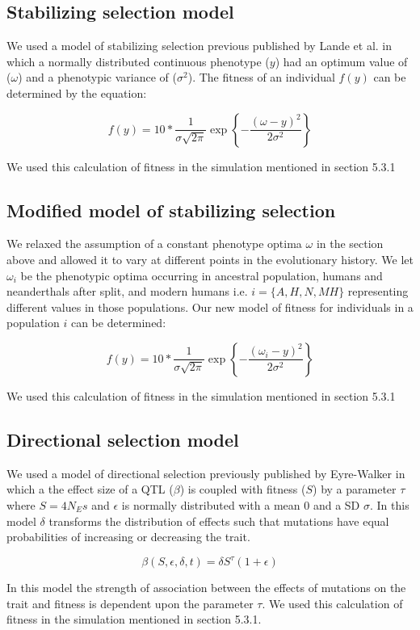 \subsection{Stabilizing selection model}
We used a model of stabilizing selection previous published by Lande et al.\cite{lande1976natural} in which a normally distributed continuous phenotype ($y$) had an optimum value of ($\omega$) and a phenotypic variance of ($\sigma^2$). The fitness of an individual $f(y)$ can be determined by the equation:

$$f(y) = 10 * \frac{1}{\sigma\sqrt{2\pi}} \exp{\left\{ -\frac{(\omega-y)^2}{2\sigma^2}\right \}}$$

We used this calculation of fitness in the simulation mentioned in section 5.3.1

\subsection{Modified model of stabilizing selection}
We relaxed the assumption of a constant phenotype optima $\omega$ in the section above and allowed it to vary at different points in the evolutionary history. We let $\omega_i$ be the phenotypic optima occurring in ancestral population, humans and neanderthals after split, and modern humans i.e. $i=\{A,H,N,MH\}$ representing different values in those populations. Our new model of fitness for individuals in a population $i$ can be determined: 

$$f(y) = 10 * \frac{1}{\sigma\sqrt{2\pi}} \exp{\left\{ -\frac{(\omega_i-y)^2}{2\sigma^2}\right \}}$$

We used this calculation of fitness in the simulation mentioned in section 5.3.1

\subsection{Directional selection model}
We used a model of directional selection previously published by Eyre-Walker \cite{eyre2010genetic} in which a the effect size of a QTL ($\beta$) is coupled with fitness ($S$) by a parameter $\tau$ where $S = 4N_Es$ and $\epsilon$ is normally distributed with a mean 0 and a SD $\sigma$. In this model $\delta$ transforms the distribution of effects such that mutations have equal probabilities of increasing or decreasing the trait.

$$\beta(S,\epsilon,\delta,t) = \delta S^{\tau}(1+\epsilon)$$

In this model the strength of association between the effects of mutations on the trait and fitness is dependent upon the parameter $\tau$. We used this calculation of fitness in the simulation mentioned in section 5.3.1.

